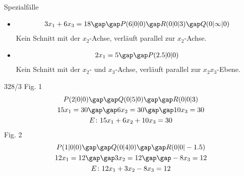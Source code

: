 Spezialfälle
\begin{itemize}
  \item
  \begin{gather*}
    3x_1 + 6x_3 = 18 \gap\gap P(6|0|0) \gap R(0|0|3) \gap Q(0|\infty|0)
  \end{gather*}
  Kein Schnitt mit der $x_2$-Achse, verläuft parallel zur $x_2$-Achse.
  \item
  \begin{gather*}
    2x_1 = 5 \gap\gap P(2.5|0|0)
  \end{gather*}
  Kein Schnitt mit der $x_2$- und $x_3$-Achse, verläuft parallel zur $x_2x_3$-Ebene.
\end{itemize}
\begin{exercise}{328/3}
  Fig. 1
  \begin{gather*}
    P(2|0|0) \gap\gap Q(0|5|0) \gap\gap R(0|0|3) \\
    15x_1 = 30 \gap\gap 6x_2 = 30 \gap\gap 10x_3 = 30 \\
    E \colon 15x_1 + 6x_2 + 10x_3 = 30
  \end{gather*}
  Fig. 2
  \begin{gather*}
    P(1|0|0) \gap\gap Q(0|4|0) \gap\gap R(0|0|-1.5) \\
    12x_1 = 12 \gap\gap 3x_2 = 12 \gap\gap -8x_3 = 12 \\
    E \colon 12x_1 + 3x_2 - 8x_3 = 12
  \end{gather*}
\end{exercise}
